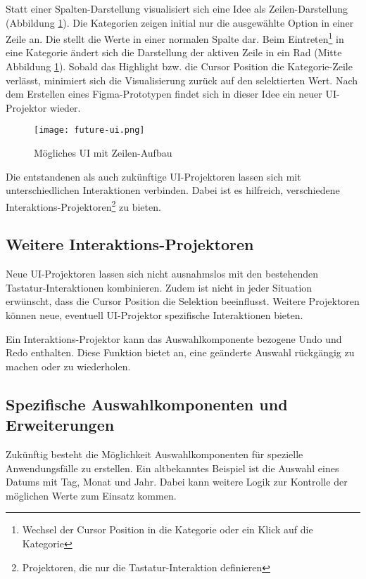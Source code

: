 Statt einer Spalten-Darstellung visualisiert sich eine Idee als Zeilen-Darstellung (Abbildung \ref{img:futureUi}). 
Die Kategorien zeigen initial nur die ausgewählte Option in einer Zeile an.
Die  stellt die Werte in einer normalen Spalte dar.
Beim Eintreten\footnote{
    Wechsel der Cursor Position in die Kategorie oder ein Klick auf die Kategorie
} in eine Kategorie ändert sich die Darstellung der aktiven Zeile in ein Rad (Mitte Abbildung \ref{img:futureUi}).
Sobald das Highlight bzw. die Cursor Position die Kategorie-Zeile verlässt, minimiert sich die Visualisierung zurück auf den selektierten Wert.
Nach dem Erstellen eines Figma-Prototypen findet sich in dieser Idee ein neuer UI-Projektor wieder.

\begin{figure}[!htb]
    \centering
    \texttt{[image: future-ui.png]}
    \caption{Mögliches UI mit Zeilen-Aufbau}
    \label{img:futureUi}
\end{figure}

Die entstandenen als auch zukünftige UI-Projektoren lassen sich mit unterschiedlichen Interaktionen verbinden.
Dabei ist es hilfreich, verschiedene Interaktions-Projektoren\footnote{
    Projektoren, die nur die Tastatur-Interaktion definieren
} zu bieten.


\subsection{Weitere Interaktions-Projektoren}
\label{sec:moreInteraction}

Neue UI-Projektoren lassen sich nicht ausnahmslos mit den bestehenden Tastatur-Inter\-aktionen kombinieren. 
Zudem ist nicht in jeder Situation erwünscht, dass die Cursor Position die Selektion beeinflusst.
Weitere Projektoren können neue, eventuell UI-Projektor spezifische Interaktionen bieten.

Ein Interaktions-Projektor kann das Auswahlkomponente bezogene Undo und Redo enthalten.
Diese Funktion bietet an, eine geänderte Auswahl rückgängig zu machen oder zu wiederholen.


\subsection{Spezifische Auswahlkomponenten und Erweiterungen}
\label{sec:specificComponents}

Zukünftig besteht die Möglichkeit Auswahlkomponenten für spezielle Anwendungsfälle zu erstellen.
Ein altbekanntes Beispiel ist die Auswahl eines Datums mit Tag, Monat und Jahr.
Dabei kann weitere Logik zur Kontrolle der möglichen Werte zum Einsatz kommen.

